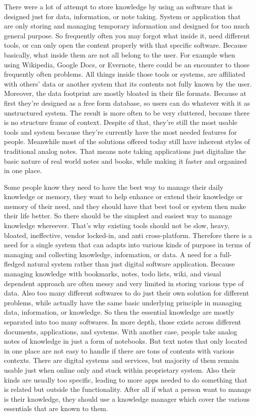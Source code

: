 There were a lot of attempt to store knowledge by using an software that is designed just for data, information, or note taking.
System or application that are only storing and managing temporary information and designed for too much general purpose.
So frequently often you may forgot what inside it, need different tools, or can only open the content properly with that specific software.
Because basically, what inside them are not all belong to the user.
For example when using Wikipedia, Google Docs, or Evernote, there could be an encounter to those frequently often problems.
All things inside those tools or systems, are affiliated with others' data or another system that its contents not fully known by the user.
Moreover, the data footprint are mostly bloated in their file formats.
Because at first they're designed as a free form database, so users can do whatever with it as unstructured system.
The result is more often to be very cluttered, because there is no structure frame of context.
Despite of that, they're still the most usable tools and system because they're currently have the most needed features for people.
Meanwhile most of the solutions offered today still have inherent styles of traditional analog notes.
That means note taking applications just digitalize the basic nature of real world notes and books, while making it faster and organized in one place.

Some people know they need to have the best way to manage their daily knowledge or memory, they want to help enhance or extend their knowledge or memory of their need, and they should have that best tool or system then make their life better.
So there should be the simplest and easiest way to manage knowledge whereever.
That's why existing tools should not be slow, heavy, bloated, ineffective, vendor locked-in, and anti cross-platform.
Therefore there is a need for a single system that can adapts into various kinds of purpose in terms of managing and collecting knowledge, information, or data.
A need for a full-fledged natural system rather than just digital software application.
Because managing knowledge with bookmarks, notes, todo lists, wiki, and visual dependent approach are often messy and very limited in storing various type of data.
Also too many different softwares to do just their own solution for different problems, while actually have the same basic underlying principle in managing data, information, or knowledge.
So then the essential knowledge are mostly separated into too many softwares.
In more depth, those exists across different documents, applications, and systems.
With another case, people take analog notes of knowledge in just a form of notebooks.
But text notes that only located in one place are not easy to handle if there are tons of contents with various contexts.
There are digital systems and services, but majority of them remain usable just when online only and stuck within proprietary system.
Also their kinds are usually too specific, leading to more apps needed to do something that is related but outside the functionality.
After all if what a person want to manage is their knowledge, they should use a knowledge manager which cover the various essentials that are known to them.
